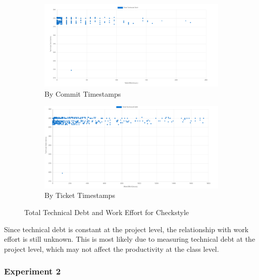 \documentclass{mpaper}
\begin{document}
\begin{figure}
	\centering
	\begin{subfigure}{.45\textwidth}
		\includegraphics[width=\linewidth]{images/checkstyle_total_debt_commit.png}
		\caption{By Commit Timestamps}
		\label{fig:td-total-debt-commit}
	\end{subfigure}
	\begin{subfigure}{.45\textwidth}
		\includegraphics[width=\linewidth]{images/checkstyle_total_debt_ticket.png}
		\caption{By Ticket Timestamps}
		\label{fig:td-total-debt-ticket}
	\end{subfigure}
	\caption{Total Technical Debt and Work Effort for Checkstyle}
	\label{fig:td-total-debt}
\end{figure}

Since technical debt is constant at the project level, the relationship with
work effort is still unknown. This is most likely due to measuring technical
debt at the project level, which may not affect the productivity at the class
level.

\subsubsection*{Experiment 2}
\label{experiment-2}
\end{document}
